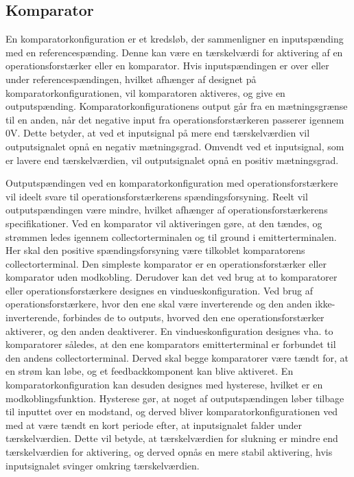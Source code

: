 \subsection{Komparator}\label{Komparatorafsnit}
En komparatorkonfiguration er et kredsløb, der sammenligner en inputspænding  med en referencespænding. Denne kan være en tærskelværdi for aktivering af en operationsforstærker eller en komparator. %
Hvis inputspændingen er over eller under referencespændingen, hvilket afhænger af designet på komparatorkonfigurationen, vil komparatoren aktiveres, og give en outputspænding. Komparatorkonfigurationens output går fra en mætningsgrænse til en anden, når det negative input fra operationsforstærkeren passerer igennem $0$V. Dette betyder, at ved et inputsignal på mere end tærskelværdien vil outputsignalet opnå en negativ mætningsgrad. Omvendt ved et inputsignal, som er lavere end tærskelværdien, vil outputsignalet opnå en positiv mætningsgrad. \cite{webster2009} 

Outputspændingen ved en komparatorkonfiguration med operationsforstærkere vil ideelt svare til operationsforstærkerens spændingsforsyning. Reelt vil outputspændingen være mindre, hvilket afhænger af operationsforstærkerens specifikationer. Ved en komparator vil aktiveringen gøre, at den tændes, og strømmen ledes igennem collectorterminalen og til ground i emitterterminalen. Her skal den positive spændingsforsyning være tilkoblet komparatorens collectorterminal. Den simpleste komparator er en operationsforstærker eller komparator uden modkobling. Derudover kan det ved brug at to komparatorer eller operationsforstærkere designes en vindueskonfiguration. Ved brug af operationsforstærkere, hvor den ene skal være inverterende og den anden ikke-inverterende,  forbindes de to outputs, hvorved den ene operationsforstærker aktiverer, og den anden deaktiverer. En vindueskonfiguration designes vha. to komparatorer således, at den ene komparators emitterterminal er forbundet til den andens collectorterminal. Derved skal begge komparatorer være tændt for, at en strøm kan løbe, og et feedbackkomponent kan blive aktiveret. En komparatorkonfiguration kan desuden designes med hysterese, hvilket er en modkoblingsfunktion. Hysterese gør, at noget af outputspændingen løber tilbage til inputtet over en modstand, og derved bliver komparatorkonfigurationen ved med at være tændt en kort periode efter, at inputsignalet falder under tærskelværdien. Dette vil betyde, at tærskelværdien for slukning er mindre end tærskelværdien for aktivering, og derved opnås en mere stabil aktivering, hvis inputsignalet svinger omkring tærskelværdien. \cite{webster2009,Storr2015} \\
  


